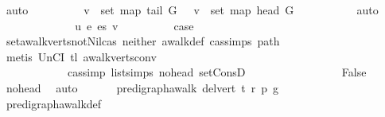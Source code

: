 \begin{isabellebody}
\ auto\isanewline
\ \ \ \ \ \ \isamarkupfalse%
\ \isamarkupfalse%
\ {\isachardoublequoteopen}v\ {\isasymin}\ set\ {\isacharparenleft}{\kern0pt}map\ {\isacharparenleft}{\kern0pt}tail\ G{\isacharparenright}{\kern0pt}\ {\isacharbrackleft}{\kern0pt}{\isacharbrackright}{\kern0pt}{\isacharparenright}{\kern0pt}\ {\isasymLongrightarrow}\ v\ {\isasymin}\ set\ {\isacharparenleft}{\kern0pt}map\ {\isacharparenleft}{\kern0pt}head\ G{\isacharparenright}{\kern0pt}\ {\isacharbrackleft}{\kern0pt}{\isacharbrackright}{\kern0pt}{\isacharparenright}{\kern0pt}{\isachardoublequoteclose}\isanewline
\ \ \ \ \ \ \ \ \isamarkupfalse%
\ auto\isanewline
\ \ \ \ \isamarkupfalse%
\isanewline
\ \ \ \ \ \ \isamarkupfalse%
\ {\isacharparenleft}{\kern0pt}{}\ u\ e\ es\ v{\isacharparenright}{\kern0pt}\isanewline
\ \ \ \ \ \ \isamarkupfalse%
\ \isamarkupfalse%
\ {\isacharquery}{\kern0pt}case\isanewline
\ \ \ \ \ \ \ \ \isamarkupfalse%
\ set{\isacharunderscore}{\kern0pt}awalk{\isacharunderscore}{\kern0pt}verts{\isacharunderscore}{\kern0pt}not{\isacharunderscore}{\kern0pt}Nil{\isacharunderscore}{\kern0pt}cas\ neither\ awalk{\isacharunderscore}{\kern0pt}def\ cas{\isachardot}{\kern0pt}simps{\isacharparenleft}{\kern0pt}{}{\isacharparenright}{\kern0pt}\ path\isanewline
\ \ \ \ \ \ \ \ \isamarkupfalse%
\ {\isacharparenleft}{\kern0pt}metis\ UnCI\ tl{}\ awalk{\isacharunderscore}{\kern0pt}verts{\isacharunderscore}{\kern0pt}conv{\isacharprime}{\kern0pt}\isanewline
\ \ \ \ \ \ \ \ \ \ \ \ cas{\isacharunderscore}{\kern0pt}simp\ list{\isachardot}{\kern0pt}simps{\isacharparenleft}{\kern0pt}{}{\isacharparenright}{\kern0pt}\ no{\isacharunderscore}{\kern0pt}head\ set{\isacharunderscore}{\kern0pt}ConsD{\isacharparenright}{\kern0pt}\ \ \isanewline
\ \ \ \ \isamarkupfalse%
\ \ \isanewline
\ \ \ \ \isamarkupfalse%
\ \isamarkupfalse%
\ False\ \isamarkupfalse%
\ no{\isacharunderscore}{\kern0pt}head\ \isamarkupfalse%
\ auto\isanewline
\ \ \isamarkupfalse%
\isanewline
\ \ \isamarkupfalse%
\ {\isachardoublequoteopen}pre{\isacharunderscore}{\kern0pt}digraph{\isachardot}{\kern0pt}awalk\ {\isacharparenleft}{\kern0pt}del{\isacharunderscore}{\kern0pt}vert\ t{\isacharparenright}{\kern0pt}\ r\ p\ g{\isachardoublequoteclose}\ \isanewline
\ \ \ \ \isamarkupfalse%
\ pre{\isacharunderscore}{\kern0pt}digraph{\isachardot}{\kern0pt}awalk{\isacharunderscore}{\kern0pt}def\isanewline

\end{isabellebody}
